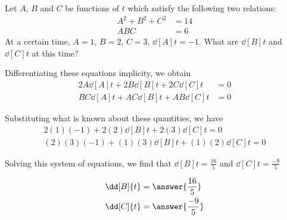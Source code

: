 \documentclass{ximera}
\author{Steven Gubkin}
\begin{document}
\begin{exercise}



Let $A$, $B$ and $C$ be functions of $t$ which satisfy the following two relations:
\begin{align*}
	A^2+B^2+C^2 &= 14 \\
	ABC &= 6 
\end{align*}
At a certain time, $A = 1$, $B=2$, $C=3$, $\dd[A]{t} = -1$.  What are
$\dd[B]{t}$ and $\dd[C]{t}$ at this time?

\begin{hint}
  Differentiating these equations implicity, we obtain
\begin{align*}
	2A\dd[A]{t}+2B\dd[B]{t}+2C \dd[C]{t} &= 0\\
	BC\dd[A]{t}+AC\dd[B]{t}+AB\dd[C]{t} &= 0
\end{align*}

\end{hint}

\begin{hint}
	Substituting what is known about these quantities, we have
\begin{align*}
	2(1)(-1)+2(2)\dd[B]{t}+2(3) \dd[C]{t} = 0\\
	(2)(3)(-1) +(1)(3)\dd[B]{t}+(1)(2)\dd[C]{t} = 0
\end{align*}
\end{hint}

Solving this system of equations, we find that $\dd[B]{t} =
\frac{16}{5}$ and $\dd[C]{t} = \frac{-9}{5}$
\begin{prompt}
	\begin{align*}
	\dd[B]{t} &= \answer{\frac{16}{5}} \\
	\dd[C]{t} &= \answer{\frac{-9}{5}}
	\end{align*}
\end{prompt}

\end{exercise}
\end{document}
